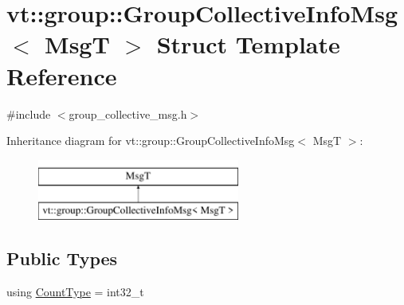\hypertarget{structvt_1_1group_1_1_group_collective_info_msg}{}\section{vt\+:\+:group\+:\+:Group\+Collective\+Info\+Msg$<$ MsgT $>$ Struct Template Reference}
\label{structvt_1_1group_1_1_group_collective_info_msg}


{\ttfamily \#include $<$group\+\_\+collective\+\_\+msg.\+h$>$}

Inheritance diagram for vt\+:\+:group\+:\+:Group\+Collective\+Info\+Msg$<$ MsgT $>$\+:\begin{figure}[H]
\begin{center}
\leavevmode
\includegraphics[height=2.000000cm]{structvt_1_1group_1_1_group_collective_info_msg}
\end{center}
\end{figure}
\subsection*{Public Types}
\begin{DoxyCompactItemize}
\item 
using \hyperlink{structvt_1_1group_1_1_group_collective_info_msg_a3d20316314d3cc3ac13ff4c5250203a5}{Count\+Type} = int32\+\_\+t
\end{DoxyCompactItemize}

